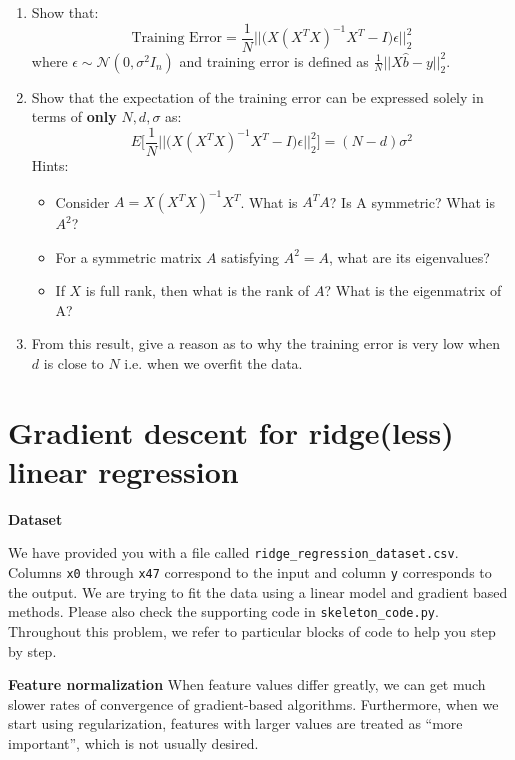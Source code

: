 \documentclass{article}
\newcommand{\nyuparagrah}[1]{\textcolor{nyupurple}{\large #1}}
\begin{document}
\begin{enumerate}
  
  \item Show that: 
    $$
    \textrm{Training Error} = \frac{1}{N} \Big|\Big| \Big( X(X^TX)^{-1}X^T - I \Big) \epsilon \Big| \Big|^2_2
    $$
    where $\epsilon \sim \mathcal{N}(0, \sigma^2 I_n)$ and training error is defined as $\frac{1}{N}||X\hat{b} - y||_2^2$. 

  \item Show that the expectation of the training error can be expressed solely in terms of \textbf{only} $N, d, \sigma$ as:
  $$
  E \Big[ \frac{1}{N} \Big|\Big| \Big( X(X^TX)^{-1}X^T - I \Big) \epsilon \Big| \Big|^2_2 \Big] = (N-d)\sigma^2
  $$ 
  Hints:
  \begin{itemize}
    \item Consider $A = X(X^TX)^{-1}X^T$. What is $A^TA$? Is A symmetric? What is $A^2$?
    \item For a symmetric matrix $A$ satisfying $A^2 = A$, what are its eigenvalues? 
    \item If $X$ is full rank, then what is the rank of $A$? What is the eigenmatrix of A?
  \end{itemize}
  
  \item From this result, give a reason as to why the training error is very low when $d$ is close to $N$ i.e. when we overfit the data. 
   
\setcounter{saveenum}{\value{enumi}}
\end{enumerate}

\section{\large Gradient descent for ridge(less) linear regression}

\nyuparagrah{\bf Dataset} 

We have provided you with a file called \texttt{ridge\_regression\_dataset.csv}. Columns \texttt{x0} through \texttt{x47} correspond to the input and column \texttt{y} corresponds to the output. We are trying to fit the data using a linear model and gradient based methods. Please also check the supporting code in \texttt{skeleton\_code.py}. Throughout this problem, we refer to particular blocks of code to help you step by step. 


\nyuparagrah{\bf Feature normalization}
When feature values differ greatly, we can get much slower rates of
convergence of gradient-based algorithms. Furthermore, when we start
using regularization, features with
larger values are treated as ``more important'', which is not usually
desired.  
\end{document}
